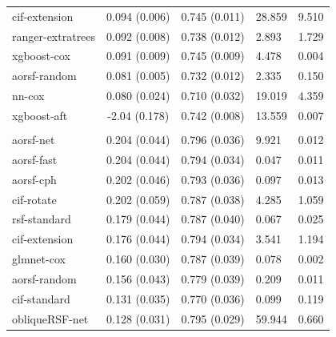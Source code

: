 \documentclass[twoside,11pt]{article}\usepackage[]{graphicx}\usepackage[]{xcolor}
\newenvironment{knitrout}{}{} %
\begin{document}
\begin{knitrout}
\begin{longtable}[t]{lcclc}
\hspace{1em}cif-extension & 0.094 (0.006) & 0.745 (0.011) & 28.859 & 9.510\\
\hspace{1em}ranger-extratrees & 0.092 (0.008) & 0.738 (0.012) & 2.893 & 1.729\\
\hspace{1em}xgboost-cox & 0.091 (0.009) & 0.745 (0.009) & 4.478 & 0.004\\
\hspace{1em}aorsf-random & 0.081 (0.005) & 0.732 (0.012) & 2.335 & 0.150\\
\hspace{1em}nn-cox & 0.080 (0.024) & 0.710 (0.032) & 19.019 & 4.359\\
\hspace{1em}xgboost-aft & -2.04 (0.178) & 0.742 (0.008) & 13.559 & 0.007\\
\addlinespace[0.3em]
\hline
\multicolumn{5}{l}{\textit{\textbf{VA lung cancer trial; death, n = 137, p = 8}}}\\
\hline
\hspace{1em}aorsf-net & 0.204 (0.044) & 0.796 (0.036) & 9.921 & 0.012\\
\hspace{1em}aorsf-fast & 0.204 (0.044) & 0.794 (0.034) & 0.047 & 0.011\\
\hspace{1em}aorsf-cph & 0.202 (0.046) & 0.793 (0.036) & 0.097 & 0.013\\
\hspace{1em}cif-rotate & 0.202 (0.059) & 0.787 (0.038) & 4.285 & 1.059\\
\hspace{1em}rsf-standard & 0.179 (0.044) & 0.787 (0.040) & 0.067 & 0.025\\
\hspace{1em}cif-extension & 0.176 (0.044) & 0.794 (0.034) & 3.541 & 1.194\\
\hspace{1em}glmnet-cox & 0.160 (0.030) & 0.787 (0.039) & 0.078 & 0.002\\
\hspace{1em}aorsf-random & 0.156 (0.043) & 0.779 (0.039) & 0.209 & 0.011\\
\hspace{1em}cif-standard & 0.131 (0.035) & 0.770 (0.036) & 0.099 & 0.119\\
\hspace{1em}obliqueRSF-net & 0.128 (0.031) & 0.795 (0.029) & 59.944 & 0.660\\

\end{longtable}
\end{knitrout}
\end{document}
